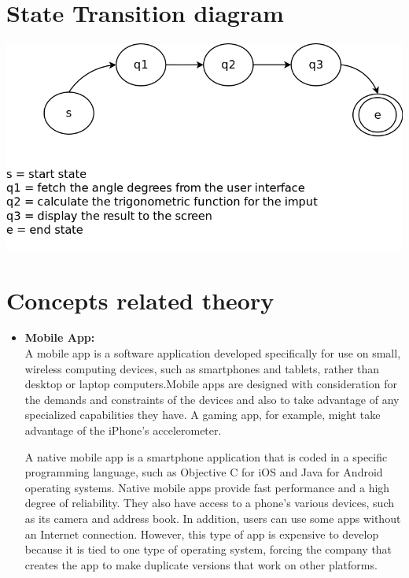 \documentclass[10pt,a4paper]{article}
\begin{document}
\section{State Transition diagram}
\includegraphics[scale=0.24]{stdg.png}


\section{Concepts related theory}
\begin{itemize}
\item \textbf{Mobile App:}\\
A mobile app is a software application developed specifically for use on small, wireless computing devices, such as smartphones and tablets, rather than desktop or laptop computers.Mobile apps are designed with consideration for the demands and constraints of the devices and also to take advantage of any specialized capabilities they have. A gaming app, for example, might take advantage of the iPhone's accelerometer. 

A native mobile app is a smartphone application that is coded in a specific programming language, such as Objective C for iOS and Java for Android operating systems. Native mobile apps provide fast performance and a high degree of reliability. They also have access to a phone's various devices, such as its camera and address book. In addition, users can use some apps without an Internet connection. However, this type of app is expensive to develop because it is tied to one type of operating system, forcing the company that creates the app to make duplicate versions that work on other platforms.
\end{itemize}
\end{document}

